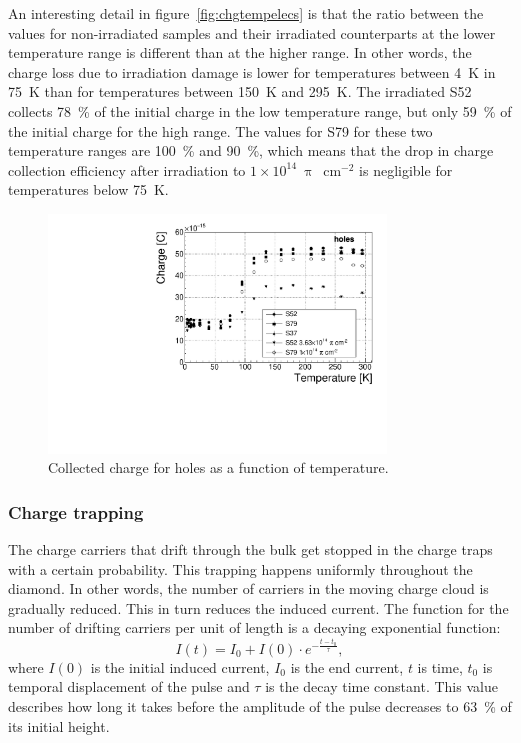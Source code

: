 An interesting detail in figure~\ref{fig:chgtempelecs} is that the ratio between the values for non-irradiated samples and their irradiated counterparts at the lower temperature range is different than at the higher range. In other words, the charge loss due to irradiation damage is lower for temperatures between 4~K in 75~K than for temperatures between 150~K and 295~K. The irradiated S52 collects 78~\% of the initial charge in the low temperature range, but only 59~\% of the initial charge for the high range. The values for S79 for these two temperature ranges are 100~\% and 90~\%, which means that the drop in charge collection efficiency after irradiation to $1\times10^{14}~\uppi$~cm$^{-2}$ is negligible for temperatures below 75~K.

\begin{figure}[!t]
\centering
\includegraphics[width=0.80\textwidth]{03_measurement_results/scripts/plots/charge-500V}
\caption{Collected charge for holes as a function of temperature.}
 \label{fig:chgtempholes}
\end{figure}

\subsubsection{Charge trapping}
The charge carriers that drift through the bulk get stopped in the charge traps with a certain probability. This trapping happens uniformly throughout the diamond. In other words, the number of carriers in the moving charge cloud is gradually reduced. This in turn reduces the induced current. The 
function for the number of drifting carriers per unit of length is a decaying exponential function:
\begin{equation}
\label{eq:decayexp}
I(t)= I_0 + I(0) \cdot e^{-\frac{t-t_0}{\tau} },
\end{equation}
where $I(0)$ is the initial induced current, $I_0$ is the end current, $t$ is time, $t_0$ is temporal displacement of the pulse and $\tau$ is the decay time constant. This value describes how long it takes before the amplitude of the pulse decreases to 63~\% of its initial height.


